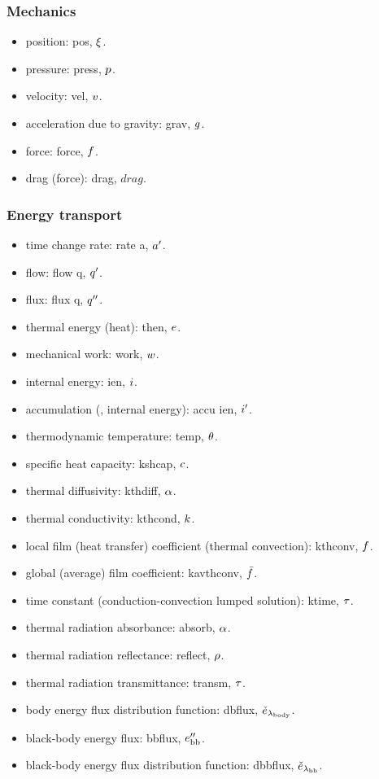 \subsubsection{Mechanics}
\begin{itemize}
\item position: pos, $\xi$.
\item pressure: press, $p$.
\item velocity: vel, $v$.
\item acceleration due to gravity: grav, $g$.
\item force: force, $f$.
\item drag (force): drag, $drag$.
\end{itemize}


\subsubsection{Energy transport}
\begin{itemize}
\item time change rate: rate a, ${a}^{\prime}$.
\item flow: flow q, ${q}^{\prime}$.
\item flux: flux q, ${q}^{\prime\prime}$.
\item thermal energy (heat): then, $e$.
\item mechanical work: work, $w$.
\item internal energy: ien, $i$.
\item accumulation (\eg, internal energy): accu ien, ${i}^{\prime}$.
\item thermodynamic temperature: temp, $\theta$.
\item specific heat capacity: kshcap, $c$.
\item thermal diffusivity: kthdiff, $\alpha$.
\item thermal conductivity: kthcond, $k$.
\item local film (heat transfer) coefficient (thermal convection): kthconv, $f$.
\item global (average) film coefficient: kavthconv, $\bar{f}$.
\item time constant (conduction-convection lumped solution): ktime, $\tau$.
\item thermal radiation absorbance: absorb, $\alpha$.
\item thermal radiation reflectance: reflect, $\rho$.
\item thermal radiation transmittance: transm, $\tau$.
\item body energy flux distribution function: dbflux, $\check{e}_{\lambda_\text{body}}$.
\item black-body energy flux: bbflux, ${e}^{\prime\prime}_\text{bb}$.
\item black-body energy flux distribution function: dbbflux, $\check{e}_{\lambda_\text{bb}}$.
\end{itemize}


